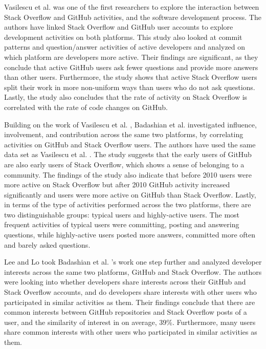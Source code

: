        Vasilescu et al. \cite{vasilescu2013stackoverflow} was one of the first researchers to explore the interaction between Stack Overflow and GitHub activities, and the software development process. The authors have linked Stack Overflow and GitHub user accounts to explore development activities on both platforms. This study also looked at commit patterns and question/answer activities of active developers and analyzed on which platform are developers more active. Their findings are significant, as they conclude that active GitHub users ask fewer questions and provide more answers than other users. Furthermore, the study shows that active Stack Overflow users split their work in more non-uniform ways than users who do not ask questions. Lastly, the study also concludes that the rate of activity on Stack Overflow is correlated with the rate of code changes on GitHub.
        
        Building on the work of Vasilescu et al. \cite{vasilescu2013stackoverflow}, Badashian et al. \cite{badashian2014involvement} investigated influence, involvement, and contribution across the same two platforms, by correlating activities on GitHub and Stack Overflow users. The authors have used the same data set as Vasilescu et al. \cite{vasilescu2013stackoverflow}. The study suggests that the early users of GitHub are also early users of Stack Overflow, which shows a sense of belonging to a community. The findings of the study also indicate that before 2010 users were more active on Stack Overflow but after 2010 GitHub activity increased significantly and users were more active on GitHub than Stack Overflow. Lastly, in terms of the type of activities performed across the two platforms, there are two distinguishable groups: typical users and highly-active users. The most frequent activities of typical users were committing, posting and answering questions, while highly-active users posted more answers, committed more often and barely asked questions. 
        
        Lee and Lo \cite{lee2017github} took Badashian et al. \cite{badashian2014involvement}'s work one step further and analyzed developer interests across the same two platforms, GitHub and Stack Overflow. The authors were looking into whether developers share interests across their GitHub and Stack Overflow accounts, and do developers share interests with other users who participated in similar activities as them. Their findings conclude that there are common interests between GitHub repositories and Stack Overflow posts of a user, and the similarity of interest in on average, 39\%. Furthermore, many users share common interests with other users who participated in similar activities as them.
        
